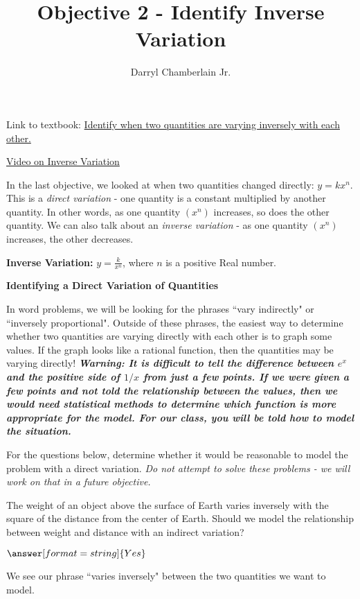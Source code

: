 \documentclass{ximera}
\author{Darryl Chamberlain Jr.}
\title{Objective 2 - Identify Inverse Variation}
\begin{document}
\begin{abstract}
		
\end{abstract}
	
\maketitle
	
Link to textbook: 
\href{https://cnx.org/contents/mwjClAV_@8.12:yUH0hROr@12/Modeling-Using-Variation}{Identify when two quantities are varying inversely with each other.}
	
\href{https://www.youtube.com/watch?v=vAwJ-WO-A3o&list=PLsCqF7qYpC5aHckH-Nh5nF3A598qhRJ8S&index=3}{Video on Inverse Variation}
	
	
In the last objective, we looked at when two quantities changed directly: $y=kx^n$. This is a \textit{direct variation} - one quantity is a constant multiplied by another quantity. In other words, as one quantity $(x^n)$ increases, so does the other quantity. We can also talk about an \textit{inverse variation} - as one quantity $(x^n)$ increases, the other decreases. 
	
\textbf{Inverse Variation:} $y = \frac{k}{x^n}$, where $n$ is a positive Real number. 
	
\textbf{Identifying a Direct Variation of Quantities}
	
In word problems, we will be looking for the phrases ``vary indirectly" or ``inversely proportional". Outside of these phrases, the easiest way to determine whether two quantities are varying directly with each other is to graph some values. If the graph looks like a rational function, then the quantities may be varying directly! \textbf{\textit{Warning: It is difficult to tell the difference between $e^x$ and the positive side of $1/x$ from just a few points. If we were given a few points and not told the relationship between the values, then we would need statistical methods to determine which function is more appropriate for the model. For our class, you will be told how to model the situation.}} 
	
For the questions below, determine whether it would be reasonable to model the problem with a direct variation. \textit{Do not attempt to solve these problems - we will work on that in a future objective.}

\begin{question}
[Astronomy] The weight of an object above the surface of Earth varies inversely with the square of the distance from the center of Earth. Should we model the relationship between weight and distance with an indirect variation?

$\answer[format=string]{Yes}$

\begin{feedback}
We see our phrase ``varies inversely" between the two quantities we want to model. 
\end{feedback}
\end{question}
\end{document}
